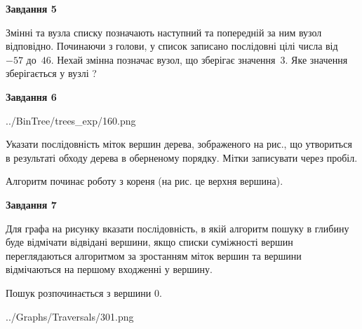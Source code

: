 \documentclass[12pt, ukrainian]{article}
\begin{document}
{\begin {large}
{\begin {center}\textbf{Завдання 5}\end {center}}\par
Змінні  та  вузла списку позначають наступний та попередній за ним вузол відповідно. Починаючи з голови, у список записано послідовні цілі числа від~$-57$ до~$46$. Нехай змінна  позначає вузол, що зберігає значення~$3$.
Яке значення зберігається у вузлі  ?\par
\newpage

{\begin {center}\textbf{Завдання 6}\end {center}}\par

\begin{center}
	{../BinTree/trees_exp/160.png}
\end{center}
Указати послідовність міток вершин дерева, зображеного на рис., що утвориться в результаті обходу дерева в оберненому порядку. Мітки записувати через пробіл.\par Алгоритм починає роботу з кореня (на рис. це верхня вершина).\par
\newpage

{\begin {center}\textbf{Завдання 7}\end {center}}\par
Для графа на рисунку вказати послідовність, в якій алгоритм пошуку в глибину буде відмічати відвідані вершини, якщо списки суміжності вершин переглядаються алгоритмом за зростанням міток вершин та вершини відмічаються на першому вход\-женні у вершину.\par
Пошук розпочинається з вершини 0.\par

\begin{center}
	{../Graphs/Traversals/301.png}
\end{center}\par
\newpage


\end{large}}
\end{document}

